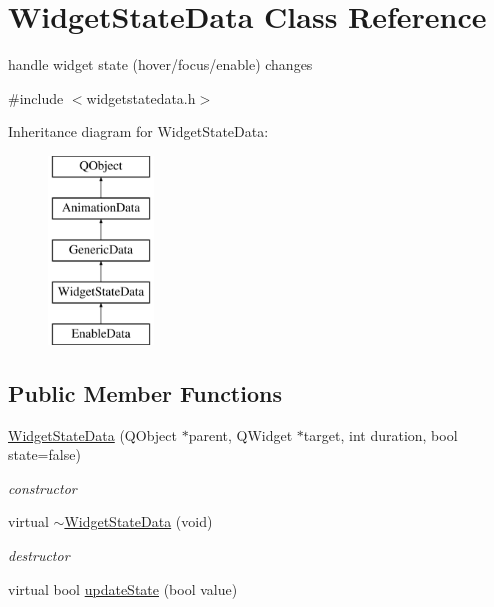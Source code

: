 \hypertarget{class_widget_state_data}{}\section{Widget\+State\+Data Class Reference}
\label{class_widget_state_data}


handle widget state (hover/focus/enable) changes  




{\ttfamily \#include $<$widgetstatedata.\+h$>$}

Inheritance diagram for Widget\+State\+Data\+:\begin{figure}[H]
\begin{center}
\leavevmode
\includegraphics[height=5.000000cm]{class_widget_state_data}
\end{center}
\end{figure}
\subsection*{Public Member Functions}
\begin{DoxyCompactItemize}
\item 
\mbox{\label{class_widget_state_data_ab4278e6191e49ff2a94c705554a8b767}} 
\hyperlink{class_widget_state_data_ab4278e6191e49ff2a94c705554a8b767}{Widget\+State\+Data} (Q\+Object $\ast$parent, Q\+Widget $\ast$target, int duration, bool state=false)
\begin{DoxyCompactList}\small\item\em constructor \end{DoxyCompactList}\item 
\mbox{\label{class_widget_state_data_a26679f8821324d3b613cff75a998fc80}} 
virtual \hyperlink{class_widget_state_data_a26679f8821324d3b613cff75a998fc80}{$\sim$\+Widget\+State\+Data} (void)
\begin{DoxyCompactList}\small\item\em destructor \end{DoxyCompactList}\item 
virtual bool \hyperlink{class_widget_state_data_a32e87d0152a3d9f522e5fbe10c2813b3}{update\+State} (bool value)
\end{DoxyCompactItemize}
